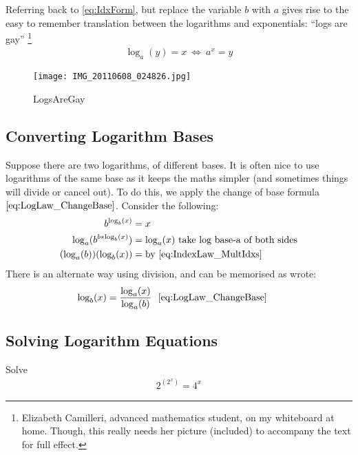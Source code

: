 Referring back to \ref{eq:IdxForm}, but replace the variable $b$ with $a$ gives
rise to the easy to remember translation between the logarithms
and exponentials: ``logs are gay'' \footnote{Elizabeth Camilleri, advanced
mathematics student, on my whiteboard at home. Though, this really needs her
picture (included) to accompany the text for full effect.}
\begin{align}
  \log_a(y) = x ~ \Longleftrightarrow ~ {a}^{x} = y  \label{eq:LogsAreGay}
\end{align}
\begin{figure}[!htb]
  \centering
  \texttt{[image: IMG\_20110608\_024826.jpg]}
  \caption{LogsAreGay}
  \label{fig:LogsAreGay}
\end{figure}

\subsection{Converting Logarithm Bases}
Suppose there are two logarithms, of different bases. It is often nice to use
logarithms of the same base as it keeps the maths simpler (and sometimes things
will divide or cancel out). To do this, we apply the change of base formula
$\eqref{eq:LogLaw_ChangeBase}$. Consider the following:
\begin{align}
  b^{\log_b(x)} & = x \\
  \log_a(b^{b * \log_b(x)}) & = \log_a(x) ~ \text{take log base-a of both sides}
  \\
  (\log_a(b))(\log_b(x)) & = \text{by \eqref{eq:IndexLaw_MultIdxs}}
\end{align}
There is an alternate way using division, and can be memorised as wrote:
\begin{align}
  \log_b(x) & = \frac{\log_a(x)}{\log_a(b)} ~ \text{
  \eqref{eq:LogLaw_ChangeBase} }
  \nonumber
\end{align} 

\subsection{Solving Logarithm Equations}
Solve
\begin{align}
  2^{(2^x)} = 4^x
\end{align}

